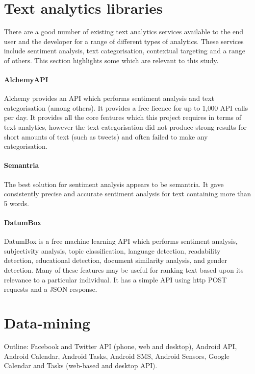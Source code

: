 \section{Text analytics libraries}

There are a good number of existing text analytics services available to the end user and the developer for a range of different types of analytics. These services include sentiment analysis, text categorisation, contextual targeting and a range of others. This section highlights some which are relevant to this study.

\paragraph{AlchemyAPI}
Alchemy provides an API which performs sentiment analysis and text categorisation (among others). It provides a free licence for up to 1,000 API calls per day. It provides all the core features which this project requires in terms of text analytics, however the text categorisation did not produce strong results for short amounts of text (such as tweets) and often failed to make any categorisation.

\paragraph{Semantria}
The best solution for sentiment analysis appears to be semantria. It gave consistently precise and accurate sentiment analysis for text containing more than 5 words. 

\paragraph{DatumBox}
DatumBox is a free machine learning API which performs sentiment analysis, subjectivity analysis, topic classification, language detection, readability detection, educational detection, document similarity analysis, and gender detection. Many of these features may be useful for ranking text based upon its relevance to a particular individual. It has a simple API using http POST requests and a JSON response. 

\section{Data-mining}

Outline: Facebook and Twitter API (phone, web and desktop), Android API, Android Calendar, Android Tasks, Android SMS, Android Sensors, Google Calendar and Tasks (web-based and desktop API).

